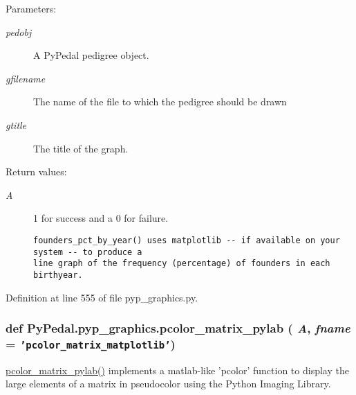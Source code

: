 \begin{Desc}
\item[Parameters:]
\begin{description}
\item[{\em pedobj}]A Py\-Pedal pedigree object. \item[{\em gfilename}]The name of the file to which the pedigree should be drawn \item[{\em gtitle}]The title of the graph. \end{description}
\end{Desc}
\begin{Desc}
\item[Return values:]
\begin{description}
\item[{\em A}]1 for success and a 0 for failure.

\footnotesize\begin{verbatim}founders_pct_by_year() uses matplotlib -- if available on your system -- to produce a
line graph of the frequency (percentage) of founders in each birthyear.
\end{verbatim}
\normalsize
 \end{description}
\end{Desc}


Definition at line 555 of file pyp\_\-graphics.py.\hypertarget{namespacePyPedal_1_1pyp__graphics_e02ac5f823a1ef850391ad396638ac7b}{
\subsubsection[pcolor\_\-matrix\_\-pylab]{\setlength{\rightskip}{0pt plus 5cm}def Py\-Pedal.pyp\_\-graphics.pcolor\_\-matrix\_\-pylab ( {\em A},  {\em fname} = {\tt 'pcolor\_\-matrix\_\-matplotlib'})}}
\label{namespacePyPedal_1_1pyp__graphics_e02ac5f823a1ef850391ad396638ac7b}


\hyperlink{namespacePyPedal_1_1pyp__graphics_e02ac5f823a1ef850391ad396638ac7b}{pcolor\_\-matrix\_\-pylab()} implements a matlab-like 'pcolor' function to display the large elements of a matrix in pseudocolor using the Python Imaging Library. 

